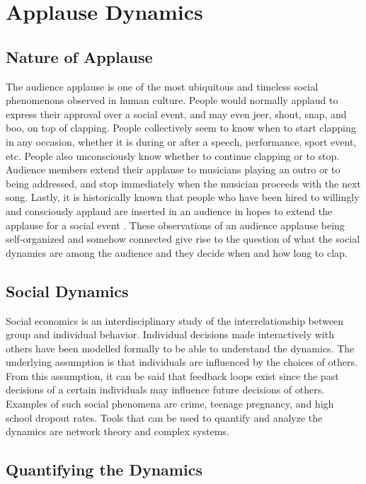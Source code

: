 \chapter{Applause Dynamics}

\section{Nature of Applause}

\hspace{\parindent} 
The audience applause is one of the most ubiquitous and timeless social phenomenons observed in human culture.
People would normally applaud to express their approval over a social event, and may even jeer, shout, snap, and boo, on top of clapping.
People collectively seem to know when to start clapping in any occasion, whether it is during or after a speech, performance, sport event, etc.
People also unconsciously know whether to continue clapping or to stop. 
Audience members extend their applause to musicians playing an outro or to being addressed, and stop immediately when the musician proceeds with the next song.
Lastly, it is historically known that people who have been hired to willingly and consciously applaud are inserted in an audience in hopes to extend the applause for a social event \cite{claque_origin}.
These observations of an audience applause being self-organized and somehow connected give rise to the question of what the social dynamics are among the audience and they decide when and how long to clap.

\section{Social Dynamics}
Social economics is an interdisciplinary study of the interrelationship between group and individual behavior. 
Individual decisions made interactively with others have been modelled formally to be able to understand the dynamics. 
The underlying assumption is that individuals are influenced by the choices of others. 
From this assumption, it can be said that feedback loops exist since the past decisions of a certain individuals may influence future decisions of others. Examples of such social phenomena are crime, teenage pregnancy, and high school dropout rates.\cite{socialDynamics}\cite{peerEffects}
Tools that can be used to quantify and analyze the dynamics are network theory and complex systems.

\section{Quantifying the Dynamics}
